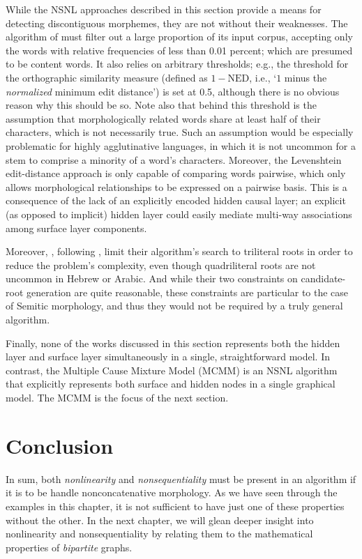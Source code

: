 While the NSNL approaches described in this section provide a means for detecting discontiguous morphemes, they are not without their weaknesses.
The algorithm of \citet{baroni-et-al:2002} must filter out a large proportion of its input corpus, accepting only the words with relative frequencies of less than 0.01 percent; which are presumed to be content words.
It also relies on arbitrary thresholds; e.g., the threshold for the orthographic similarity measure (defined as $1 - \text{NED}$,  i.e., `$1$ minus the \emph{normalized} minimum edit distance') is set at 0.5, although there is no obvious reason why this should be so.
Note also that behind this threshold is the assumption that morphologically related words share at least half of their characters, which is not necessarily true. Such an assumption would be especially problematic for highly agglutinative languages, 
in which it is not uncommon for a stem to comprise a minority of a word's characters.
Moreover, the Levenshtein edit-distance approach is only capable of comparing words pairwise, which only allows morphological relationships to be expressed on a pairwise basis. This is a consequence of the lack of an explicitly encoded hidden causal layer; an explicit (as opposed to implicit) hidden layer could easily mediate multi-way associations among surface layer components.                                   

Moreover, \citet{rodrigues-and-cavar:2005}, following \citet{elghamry:2005}, limit their algorithm's search to triliteral roots in order to reduce the problem's complexity, even though quadriliteral roots are not uncommon in Hebrew or Arabic.
And while their two constraints on candidate-root generation are quite reasonable, these constraints are particular to the case of Semitic morphology, and thus they would not be required by a truly general algorithm.

Finally, none of the works discussed in this section represents both the hidden layer and surface layer simultaneously in a single, straightforward model. In contrast, the Multiple Cause Mixture Model (MCMM) \citep{saund:94} is an NSNL algorithm that explicitly represents both surface and hidden nodes in a single graphical model. The MCMM is the focus of the next section.

\section{Conclusion}
In sum, both \emph{nonlinearity} and \emph{nonsequentiality} must be present in an algorithm if it is to be handle nonconcatenative morphology. As we have seen through the examples in this chapter, it is not sufficient to have just one of these properties without the other. In the next chapter, we will glean deeper insight into nonlinearity and nonsequentiality by relating them to the mathematical properties of \emph{bipartite} graphs. 